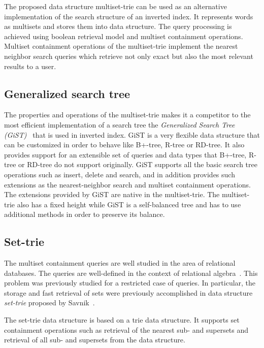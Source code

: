 The proposed data structure multiset-trie can be used as an alternative implementation 
of the search structure of an inverted index. It represents words as multisets and 
stores them into data structure. The query processing is achieved using boolean 
retrieval model \cite{manning2008introduction} and multiset containment operations. 
Multiset containment operations of the multiset-trie implement the nearest neighbor 
search queries which retrieve not only exact but also the most relevant results 
to a user. 

\subsection{Generalized search tree}
The properties and operations of the multiset-trie makes it a competitor to the 
most efficient implementation of a search tree the \emph{Generalized Search Tree 
(GiST)}~\cite{broder2006indexing,hellerstein1995generalized,kornacker1999high} 
that is used in inverted index. GiST is a very flexible data structure that can be 
customized in order to behave like B+-tree, R-tree or RD-tree. It also provides 
support for an extensible set of queries and data types that B+-tree, R-tree or RD-tree 
do not support originally. GiST supports all the basic search tree operations such as 
insert, delete and search, and in addition provides such extensions as the 
nearest-neighbor search and multiset containment operations. The extensions 
provided by GiST are native in the multiset-trie. The multiset-trie also has a fixed 
height while GiST is a self-balanced tree and has to use additional methods in 
order to preserve its balance. 

\subsection{Set-trie}
The multiset containment queries are well studied in the area of relational 
databases. The queries are well-defined in the context of relational 
algebra~\cite{Lamperti2000msetsinds}. This problem was previously studied 
for a restricted case of queries. In particular, the storage and fast retrieval of sets 
were previously accomplished in data structure \emph{set-trie} proposed by 
Savnik~\cite{savnik2013index}. 

The set-trie data structure is based on a trie data structure. It supports set 
containment operations such as retrieval of the nearest sub- and supersets and 
retrieval of all sub- and supersets from the data structure.

